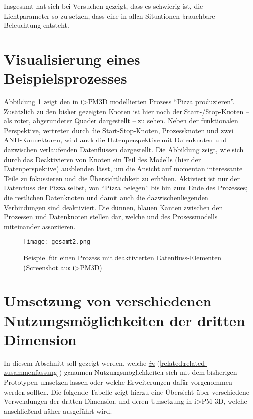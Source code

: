 \documentclass[a4paper,10pt]{sphinxmanual}
\begin{document}
Insgesamt hat sich bei Versuchen gezeigt, dass es schwierig ist, die Lichtparameter so zu setzen, dass eine in allen Situationen brauchbare Beleuchtung entsteht.


\section{Visualisierung eines Beispielsprozesses}
\label{visualisierung:vis-beispiel}\label{visualisierung:visualisierung-eines-beispielsprozesses}
\hyperref[visualisierung:beispielprozess-screenshot]{Abbildung  \ref*{visualisierung:beispielprozess-screenshot}} zeigt den in i\textgreater{}PM3D modellierten Prozess "`Pizza produzieren"'.
Zusätzlich zu den bisher gezeigten Knoten ist hier noch der Start-/Stop-Knoten – als roter, abgerundeter Quader dargestellt – zu sehen.
Neben der funktionalen Perspektive, vertreten durch die Start-Stop-Knoten, Prozessknoten und zwei AND-Konnektoren, wird auch die Datenperspektive mit Datenknoten und dazwischen verlaufenden Datenflüssen dargestellt.
Die Abbildung zeigt, wie sich durch das Deaktivieren von Knoten ein Teil des Modells (hier der Datenperspektive) ausblenden lässt, um die Ansicht auf momentan interessante Teile zu fokussieren und die Übersichtlichkeit zu erhöhen.
Aktiviert ist nur der Datenfluss der Pizza selbst, von "`Pizza belegen"' bis hin zum Ende des Prozesses; die restlichen Datenknoten und damit auch die dazwischenliegenden Verbindungen sind deaktiviert.
Die dünnen, blauen Kanten zwischen den Prozessen und Datenknoten stellen  dar, welche  und  des Prozessmodells miteinander assoziieren.
\begin{figure}[htbp]
\centering
\capstart

\texttt{[image: gesamt2.png]}
\caption{Beispiel für einen Prozess mit deaktivierten Datenfluss-Elementen (Screenshot aus i\textgreater{}PM3D)}\label{visualisierung:beispielprozess-screenshot}\end{figure}


\section{Umsetzung von verschiedenen Nutzungsmöglichkeiten der dritten Dimension}
\label{visualisierung:vis-umsetzung}\label{visualisierung:umsetzung-von-verschiedenen-nutzungsmoglichkeiten-der-dritten-dimension}
In diesem Abschnitt soll gezeigt werden, welche {\hyperref[related:related-zusammenfassung]{\emph{in}}} (\autoref*{related:related-zusammenfassung}) genannen Nutzungsmöglichkeiten sich mit dem bisherigen Prototypen umsetzen lassen oder welche Erweiterungen dafür vorgenommen werden sollten.
Die folgende Tabelle zeigt hierzu eine Übersicht über verschiedene Verwendungen der dritten Dimension und deren Umsetzung in i\textgreater{}PM 3D, welche anschließend näher ausgeführt wird.
\end{document}
